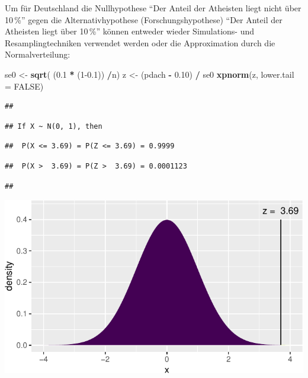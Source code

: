 \documentclass[12pt,ngerman,paper=a4,pagesize,DIV=13]{scrreprt}
\newenvironment{Shaded}{\begin{snugshade}}{\end{snugshade}}
\newcommand{\DataTypeTok}[1]{\textcolor[rgb]{0.13,0.29,0.53}{#1}}
\newcommand{\DecValTok}[1]{\textcolor[rgb]{0.00,0.00,0.81}{#1}}
\newcommand{\FloatTok}[1]{\textcolor[rgb]{0.00,0.00,0.81}{#1}}
\newcommand{\KeywordTok}[1]{\textcolor[rgb]{0.13,0.29,0.53}{\textbf{#1}}}
\newcommand{\NormalTok}[1]{#1}
\newcommand{\OperatorTok}[1]{\textcolor[rgb]{0.81,0.36,0.00}{\textbf{#1}}}
\newcommand{\OtherTok}[1]{\textcolor[rgb]{0.56,0.35,0.01}{#1}}
\newcommand{\StringTok}[1]{\textcolor[rgb]{0.31,0.60,0.02}{#1}}
\begin{document}
Um für Deutschland die Nullhypothese \enquote{Der Anteil der Atheisten
liegt nicht über 10\(\,\)\%} gegen die Alternativhypothese
(Forschungshypothese) \enquote{Der Anteil der Atheisten liegt über
10\(\,\)\%} können entweder wieder Simulations- und Resamplingtechniken
verwendet werden oder die Approximation durch die Normalverteilung:

\begin{Shaded}
\begin{Highlighting}[]
\NormalTok{se0 <-}\StringTok{ }\KeywordTok{sqrt}\NormalTok{( (}\FloatTok{0.1} \OperatorTok{*}\StringTok{ }\NormalTok{(}\DecValTok{1}\FloatTok{-0.1}\NormalTok{)) }\OperatorTok{/}\NormalTok{n)}
\NormalTok{z <-}\StringTok{ }\NormalTok{(pdach }\OperatorTok{-}\StringTok{ }\FloatTok{0.10}\NormalTok{) }\OperatorTok{/}\StringTok{ }\NormalTok{se0}
\KeywordTok{xpnorm}\NormalTok{(z, }\DataTypeTok{lower.tail =} \OtherTok{FALSE}\NormalTok{)}
\end{Highlighting}
\end{Shaded}

\begin{verbatim}
## 
\end{verbatim}

\begin{verbatim}
## If X ~ N(0, 1), then
\end{verbatim}

\begin{verbatim}
##  P(X <= 3.69) = P(Z <= 3.69) = 0.9999
\end{verbatim}

\begin{verbatim}
##  P(X >  3.69) = P(Z >  3.69) = 0.0001123
\end{verbatim}

\begin{verbatim}
## 
\end{verbatim}

\includegraphics{DatenerhebungStatistik-Uebung_files/figure-latex/unnamed-chunk-106-1.pdf}
\end{document}
